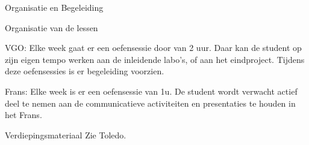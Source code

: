 \documentclass{studiewijzer}
\begin{document}
\showheader

\begin{categorybox}{Organisatie en Begeleiding}
    \begin{category}{Organisatie van de lessen}
        \begin{items}
            \item VGO: Elke week gaat er een oefensessie door van 2 uur. Daar
                  kan de student op zijn eigen tempo werken aan de inleidende labo’s,
                  of aan het eindproject. Tijdens deze oefensessies is er begeleiding
                  voorzien.
            \item Frans: Elke week is er een oefensessie van 1u. De student
                  wordt verwacht actief deel te nemen aan de communicatieve
                  activiteiten en presentaties te houden in het Frans.
        \end{items}
    \end{category}
    \categoryseparator
    \begin{category}{Verdiepingsmateriaal}%
        Zie Toledo.%
    \end{category}
\end{categorybox}
\end{document}
